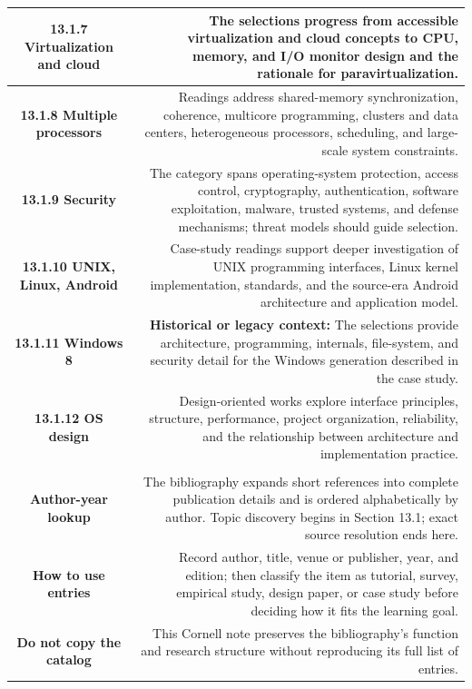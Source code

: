 \documentclass[10pt,letterpaper]{article}
\begin{document}
\begin{longtable}{C N}
\textbf{13.1.7 Virtualization and cloud} & The selections progress from accessible virtualization and cloud concepts to CPU, memory, and I/O monitor design and the rationale for paravirtualization.\\\hline
\textbf{13.1.8 Multiple processors} & Readings address shared-memory synchronization, coherence, multicore programming, clusters and data centers, heterogeneous processors, scheduling, and large-scale system constraints.\\\hline
\textbf{13.1.9 Security} & The category spans operating-system protection, access control, cryptography, authentication, software exploitation, malware, trusted systems, and defense mechanisms; threat models should guide selection.\\\hline
\textbf{13.1.10 UNIX, Linux, Android} & Case-study readings support deeper investigation of UNIX programming interfaces, Linux kernel implementation, standards, and the source-era Android architecture and application model.\\\hline
\textbf{13.1.11 Windows 8} & \textcolor{legacy}{\textbf{Historical or legacy context:}} The selections provide architecture, programming, internals, file-system, and security detail for the Windows generation described in the case study.\\\hline
\textbf{13.1.12 OS design} & Design-oriented works explore interface principles, structure, performance, project organization, reliability, and the relationship between architecture and implementation practice.\\\hline
{}\\*\hline
\textbf{Author-year lookup} & The bibliography expands short references into complete publication details and is ordered alphabetically by author. Topic discovery begins in Section 13.1; exact source resolution ends here.\\\hline
\textbf{How to use entries} & Record author, title, venue or publisher, year, and edition; then classify the item as tutorial, survey, empirical study, design paper, or case study before deciding how it fits the learning goal.\\\hline
\textbf{Do not copy the catalog} & This Cornell note preserves the bibliography's function and research structure without reproducing its full list of entries.\\\hline
\end{longtable}
\normalsize
\end{document}
